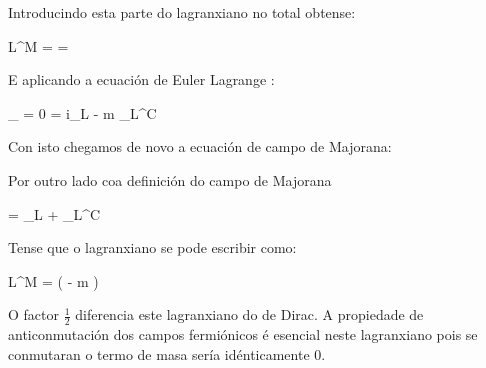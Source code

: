 \documentclass[a4paper,12pt]{article}
\begin{document}
\beq
{}\ebx
\eeq

Introducindo esta parte do lagranxiano no total obtense:

\beq
\chula L^M =   =  
\eeq

E aplicando a ecuación de Euler Lagrange :

\beq
\partial_\mu {} = 0 \qquad \qquad
{} =  i\slx\partial \nu_L -  m \nu_L^C
\eeq

Con isto chegamos de novo a ecuación de campo de Majorana:

\beq
{}\ebx
\eeq

Por outro lado coa definición do campo de Majorana

\beq
\nu = \nu_L + \nu_L^C
\eeq

Tense que o lagranxiano se pode escribir como:

\beq
\chula L^M =  \barra\nu \left(  \dvec{\slx\partial} - m \right) \nu
\eeq

O factor $\frac{1}{2}$ diferencia este lagranxiano do de Dirac. A propiedade de anticonmutación dos campos fermiónicos é esencial neste lagranxiano pois se conmutaran o termo de masa sería idénticamente 0.
\end{document}
